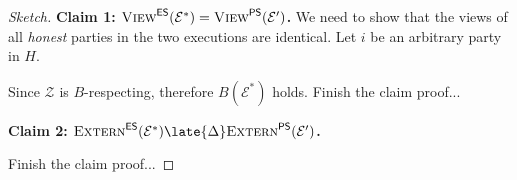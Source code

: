 \begin{proof}[Sketch]
  \noindent
  \textbf{Claim 1: $\textsc{View}^{\textsf{ES}}(\mathcal{E}^*) = \textsc{View}^{\textsf{PS}}(\mathcal{E}')$.} We need to show
  that the views of all \emph{honest} parties in the two executions are identical. Let
  $i$ be an arbitrary party in $H$.

  Since $\mathcal{Z}$ is $B$-respecting, therefore $B(\mathcal{E}^*)$ holds.
  {\color{red} Finish the claim proof...}

  \noindent
  \textbf{Claim 2: $\LCExtern(\mathcal{E}^*) \late{\Delta} \PEExtern(\mathcal{E}')$.}

  {\color{red} Finish the claim proof...}
\end{proof}

